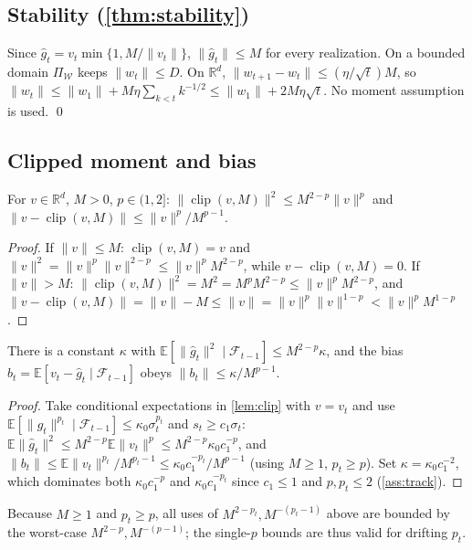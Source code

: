 \documentclass{article}
\newcommand{\E}{\mathbb{E}}
\newcommand{\R}{\mathbb{R}}
\newcommand{\norm}[1]{\lVert #1 \rVert}
\newcommand{\gt}{g_t}
\newcommand{\clip}{\operatorname{clip}}
\begin{document}
\subsection{Stability (\texorpdfstring{\cref{thm:stability}}{Theorem 1})}
Since $\hat g_t=v_t\min\{1,M/\norm{v_t}\}$, $\norm{\hat g_t}\le M$ for every
realization. On a bounded domain $\Pi_{\mathcal W}$ keeps $\norm{w_t}\le D$. On $\R^d$,
$\norm{w_{t+1}-w_t}\le(\eta/\sqrt t)M$, so
$\norm{w_t}\le\norm{w_1}+M\eta\sum_{k<t}k^{-1/2}\le\norm{w_1}+2M\eta\sqrt t$. No moment
assumption is used. \qed

\subsection{Clipped moment and bias}
\begin{lemma}
\label{lem:clip}
For $v\in\R^d$, $M>0$, $p\in(1,2]$: $\norm{\clip(v,M)}^2\le M^{2-p}\norm v^p$ and
$\norm{v-\clip(v,M)}\le\norm v^p/M^{p-1}$.
\end{lemma}
\begin{proof}
If $\norm v\le M$: $\clip(v,M)=v$ and $\norm v^2=\norm v^p\norm v^{2-p}\le\norm v^p
M^{2-p}$, while $v-\clip(v,M)=0$. If $\norm v>M$: $\norm{\clip(v,M)}^2=M^2=M^pM^{2-p}
\le\norm v^pM^{2-p}$, and $\norm{v-\clip(v,M)}=\norm v-M\le\norm v=\norm v^p\norm
v^{1-p}<\norm v^pM^{1-p}$.
\end{proof}
\begin{lemma}
\label{lem:moment}
There is a constant $\kappa$ with $\E[\norm{\hat g_t}^2\mid\mathcal F_{t-1}]\le
M^{2-p}\kappa$, and the bias $b_t=\E[v_t-\hat g_t\mid\mathcal F_{t-1}]$ obeys
$\norm{b_t}\le\kappa/M^{p-1}$.
\end{lemma}
\begin{proof}
Take conditional expectations in \cref{lem:clip} with $v=v_t$ and use
$\E[\norm{\gt}^{p_t}\mid\mathcal F_{t-1}]\le\kappa_0\sigma_t^{p_t}$ and
$s_t\ge c_1\sigma_t$: $\E\norm{\hat g_t}^2\le M^{2-p}\E\norm{v_t}^p\le M^{2-p}
\kappa_0 c_1^{-p}$, and $\norm{b_t}\le\E\norm{v_t}^{p_t}/M^{p_t-1}\le\kappa_0 c_1^{-p_t}
/M^{p-1}$ (using $M\ge1$, $p_t\ge p$). Set $\kappa=\kappa_0 c_1^{-2}$, which dominates both
$\kappa_0 c_1^{-p}$ and $\kappa_0 c_1^{-p_t}$ since $c_1\le1$ and $p,p_t\le2$
(\cref{ass:track}).
\end{proof}
Because $M\ge1$ and $p_t\ge p$, all uses of $M^{2-p_t},M^{-(p_t-1)}$ above are bounded
by the worst-case $M^{2-p},M^{-(p-1)}$; the single-$p$ bounds are thus valid for
drifting $p_t$.
\end{document}
